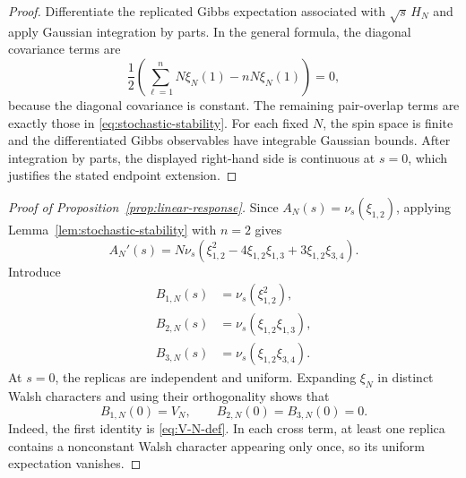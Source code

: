 \documentclass[letterpaper,11pt,reqno]{amsart}
\begin{document}
\begin{proof}
Differentiate the replicated Gibbs expectation associated with
$\sqrt{s}\,H_N$ and apply Gaussian integration by parts. In the
general formula, the diagonal covariance terms are
\[
\frac12\left(
\sum_{\ell=1}^n N\xi_N(1)-nN\xi_N(1)
\right)=0,
\]
because the diagonal covariance is constant. The remaining
pair-overlap terms are exactly those in
\eqref{eq:stochastic-stability}. For each fixed $N$, the spin space is finite and the differentiated Gibbs observables have integrable Gaussian bounds. After integration by parts, the displayed right-hand side is continuous at $s=0$, which justifies the stated endpoint extension.
\end{proof}

\begin{proof}[Proof of Proposition~\ref{prop:linear-response}]
Since $A_N(s)=\nu_s(\xi_{1,2})$, applying
Lemma~\ref{lem:stochastic-stability} with $n=2$ gives
\begin{equation}
A_N'(s)
=
N\nu_s\left(
\xi_{1,2}^2
-4\xi_{1,2}\xi_{1,3}
+3\xi_{1,2}\xi_{3,4}
\right).
\label{eq:A-N-derivative}
\end{equation}
Introduce
\begin{align}
B_{1,N}(s)&=\nu_s(\xi_{1,2}^2),
\label{eq:B1-def}\\
B_{2,N}(s)&=\nu_s(\xi_{1,2}\xi_{1,3}),
\label{eq:B2-def}\\
B_{3,N}(s)&=\nu_s(\xi_{1,2}\xi_{3,4}).
\label{eq:B3-def}
\end{align}
At $s=0$, the replicas are independent and uniform. Expanding
$\xi_N$ in distinct Walsh characters and using their orthogonality
shows that
\begin{equation}
B_{1,N}(0)=V_N,
\qquad
B_{2,N}(0)=B_{3,N}(0)=0.
\label{eq:B-initial-values}
\end{equation}
Indeed, the first identity is \eqref{eq:V-N-def}. In each cross term,
at least one replica contains a nonconstant Walsh character appearing
only once, so its uniform expectation vanishes.


\end{proof}
\end{document}
